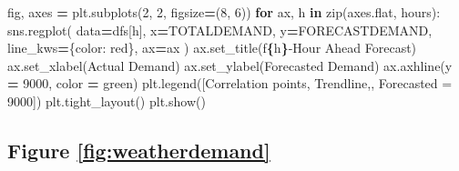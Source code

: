 \documentclass[mstat,12pt]{unswthesis}
\newenvironment{Shaded}{\begin{snugshade}}{\end{snugshade}}
\newcommand{\BuiltInTok}[1]{#1}
\newcommand{\ControlFlowTok}[1]{\textcolor[rgb]{0.13,0.29,0.53}{\textbf{#1}}}
\newcommand{\DecValTok}[1]{\textcolor[rgb]{0.00,0.00,0.81}{#1}}
\newcommand{\KeywordTok}[1]{\textcolor[rgb]{0.13,0.29,0.53}{\textbf{#1}}}
\newcommand{\NormalTok}[1]{#1}
\newcommand{\OperatorTok}[1]{\textcolor[rgb]{0.81,0.36,0.00}{\textbf{#1}}}
\newcommand{\SpecialCharTok}[1]{\textcolor[rgb]{0.81,0.36,0.00}{\textbf{#1}}}
\newcommand{\SpecialStringTok}[1]{\textcolor[rgb]{0.31,0.60,0.02}{#1}}
\newcommand{\StringTok}[1]{\textcolor[rgb]{0.31,0.60,0.02}{#1}}
\begin{document}
\begin{Shaded}
\begin{Highlighting}[]
\NormalTok{fig, axes }\OperatorTok{=}\NormalTok{ plt.subplots(}\DecValTok{2}\NormalTok{, }\DecValTok{2}\NormalTok{, figsize}\OperatorTok{=}\NormalTok{(}\DecValTok{8}\NormalTok{, }\DecValTok{6}\NormalTok{))}
\ControlFlowTok{for}\NormalTok{ ax, h }\KeywordTok{in} \BuiltInTok{zip}\NormalTok{(axes.flat, hours):}
\NormalTok{    sns.regplot(}
\NormalTok{        data}\OperatorTok{=}\NormalTok{dfs[h],}
\NormalTok{        x}\OperatorTok{=}\StringTok{\textquotesingle{}TOTALDEMAND\textquotesingle{}}\NormalTok{,}
\NormalTok{        y}\OperatorTok{=}\StringTok{\textquotesingle{}FORECASTDEMAND\textquotesingle{}}\NormalTok{,}
\NormalTok{        line\_kws}\OperatorTok{=}\NormalTok{\{}\StringTok{\textquotesingle{}color\textquotesingle{}}\NormalTok{: }\StringTok{\textquotesingle{}red\textquotesingle{}}\NormalTok{\},}
\NormalTok{        ax}\OperatorTok{=}\NormalTok{ax}
\NormalTok{    )}
\NormalTok{    ax.set\_title(}\SpecialStringTok{f\textquotesingle{}}\SpecialCharTok{\{}\NormalTok{h}\SpecialCharTok{\}}\SpecialStringTok{{-}Hour Ahead Forecast\textquotesingle{}}\NormalTok{)}
\NormalTok{    ax.set\_xlabel(}\StringTok{\textquotesingle{}Actual Demand\textquotesingle{}}\NormalTok{)}
\NormalTok{    ax.set\_ylabel(}\StringTok{\textquotesingle{}Forecasted Demand\textquotesingle{}}\NormalTok{)}
\NormalTok{    ax.axhline(y }\OperatorTok{=} \DecValTok{9000}\NormalTok{,}
\NormalTok{                color }\OperatorTok{=} \StringTok{\textquotesingle{}green\textquotesingle{}}\NormalTok{)}
\NormalTok{plt.legend([}\StringTok{\textquotesingle{}Correlation points\textquotesingle{}}\NormalTok{, }\StringTok{\textquotesingle{}Trendline\textquotesingle{}}\NormalTok{,}\StringTok{\textquotesingle{}\textquotesingle{}}\NormalTok{,}
                     \StringTok{\textquotesingle{}Forecasted = 9000\textquotesingle{}}\NormalTok{])}
\NormalTok{plt.tight\_layout()}
\NormalTok{plt.show()}
\end{Highlighting}
\end{Shaded}

\subsection*{Figure \ref{fig:weatherdemand}}\label{figure-reffigweatherdemand}
\end{document}
